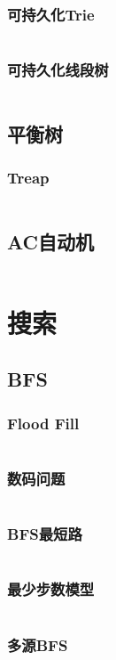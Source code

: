 \documentclass[a4paper,12pt]{article}
\begin{document}
\subsubsection{可持久化Trie}
\inputminted[breaklines]{c++}{ds/last_trie.cc}
\subsubsection{可持久化线段树}
\inputminted[breaklines]{c++}{ds/last_seg.cc}
\subsection{平衡树}
\subsubsection{Treap}
\inputminted[breaklines]{c++}{ds/treap.cc}
\subsection{AC自动机}
\inputminted[breaklines]{c++}{ds/ac_auto.cc}


\newpage  
\section{搜索}
\subsection{BFS}
\subsubsection{Flood Fill}
\inputminted[breaklines]{c++}{search/bfs/flood.cc}
\subsubsection{数码问题}
\inputminted[breaklines]{c++}{search/bfs/shuma.cc}
\subsubsection{BFS最短路}
\inputminted[breaklines]{c++}{search/bfs/path.cc}
\subsubsection{最少步数模型}
\inputminted[breaklines]{c++}{search/bfs/min_step.cc}
\subsubsection{多源BFS}
\inputminted[breaklines]{c++}{search/bfs/mul_source.cc}
\end{document}
